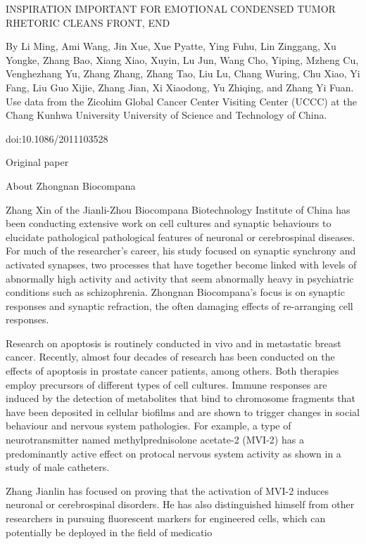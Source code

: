 \documentclass{article}
\begin{document}
INSPIRATION IMPORTANT FOR EMOTIONAL CONDENSED TUMOR RHETORIC CLEANS FRONT, END

By Li Ming, Ami Wang, Jin Xue, Xue Pyatte, Ying Fuhu, Lin Zinggang, Xu Yongke, Zhang Bao, Xiang Xiao, Xuyin, Lu Jun, Wang Cho, Yiping, Mzheng Cu, Venghezhang Yu, Zhang Zhang, Zhang Tao, Liu Lu, Chang Wuring, Chu Xiao, Yi Fang, Liu Guo Xijie, Zhang Jian, Xi Xiaodong, Yu Zhiqing, and Zhang Yi Fuan. Use data from the Zicohim Global Cancer Center Visiting Center (UCCC) at the Chang Kunhwa University University of Science and Technology of China.

doi:10.1086/2011103528

Original paper

About Zhongnan Biocompana

Zhang Xin of the Jianli-Zhou Biocompana Biotechnology Institute of China has been conducting extensive work on cell cultures and synaptic behaviours to elucidate pathological pathological features of neuronal or cerebrospinal diseases. For much of the researcher’s career, his study focused on synaptic synchrony and activated synapses, two processes that have together become linked with levels of abnormally high activity and activity that seem abnormally heavy in psychiatric conditions such as schizophrenia. Zhongnan Biocompana’s focus is on synaptic responses and synaptic refraction, the often damaging effects of re-arranging cell responses.

Research on apoptosis is routinely conducted in vivo and in metastatic breast cancer. Recently, almost four decades of research has been conducted on the effects of apoptosis in prostate cancer patients, among others. Both therapies employ precursors of different types of cell cultures. Immune responses are induced by the detection of metabolites that bind to chromosome fragments that have been deposited in cellular biofilms and are shown to trigger changes in social behaviour and nervous system pathologies. For example, a type of neurotransmitter named methylprednisolone acetate-2 (MVI-2) has a predominantly active effect on protocal nervous system activity as shown in a study of male catheters.

Zhang Jianlin has focused on proving that the activation of MVI-2 induces neuronal or cerebrospinal disorders. He has also distinguished himself from other researchers in pursuing fluorescent markers for engineered cells, which can potentially be deployed in the field of medicatio
\end{document}
